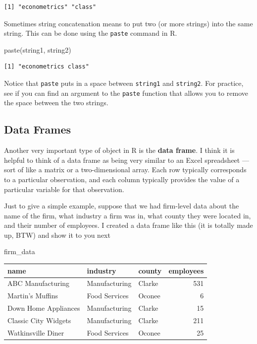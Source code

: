 \documentclass[
  letterpaper,
  DIV=11,
  numbers=noendperiod]{scrreprt}
\newenvironment{Shaded}{\begin{snugshade}}{\end{snugshade}}
\newcommand{\FunctionTok}[1]{\textcolor[rgb]{0.28,0.35,0.67}{#1}}
\newcommand{\NormalTok}[1]{\textcolor[rgb]{0.00,0.23,0.31}{#1}}
\begin{document}
\begin{verbatim}
[1] "econometrics" "class"       
\end{verbatim}

Sometimes string concatenation means to put two (or more strings) into
the same string. This can be done using the \texttt{paste} command in R.

\begin{Shaded}
\begin{Highlighting}[]
\FunctionTok{paste}\NormalTok{(string1, string2)}
\end{Highlighting}
\end{Shaded}

\begin{verbatim}
[1] "econometrics class"
\end{verbatim}

Notice that \texttt{paste} puts in a space between \texttt{string1} and
\texttt{string2}. For practice, see if you can find an argument to the
\texttt{paste} function that allows you to remove the space between the
two strings.

\subsection{Data Frames}\label{data-frames}

Another very important type of object in R is the \textbf{data frame}. I
think it is helpful to think of a data frame as being very similar to an
Excel spreadsheet --- sort of like a matrix or a two-dimensional array.
Each row typically corresponds to a particular observation, and each
column typically provides the value of a particular variable for that
observation.

Just to give a simple example, suppose that we had firm-level data about
the name of the firm, what industry a firm was in, what county they were
located in, and their number of employees. I created a data frame like
this (it is totally made up, BTW) and show it to you next

\begin{Shaded}
\begin{Highlighting}[]
\NormalTok{firm\_data}
\end{Highlighting}
\end{Shaded}

\begin{longtable}[]{@{}lllr@{}}
\toprule\noalign{}
name & industry & county & employees \\
\midrule\noalign{}
\endhead
\bottomrule\noalign{}
\endlastfoot
ABC Manufacturing & Manufacturing & Clarke & 531 \\
Martin's Muffins & Food Services & Oconee & 6 \\
Down Home Appliances & Manufacturing & Clarke & 15 \\
Classic City Widgets & Manufacturing & Clarke & 211 \\
Watkinsville Diner & Food Services & Oconee & 25 \\
\end{longtable}
\end{document}
